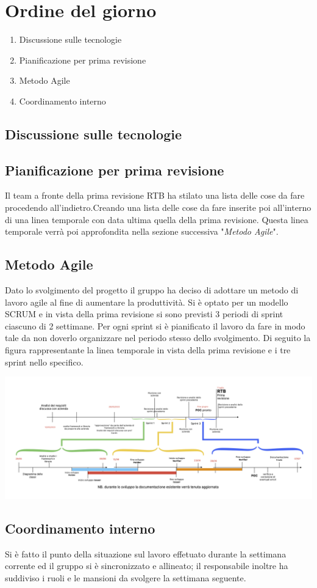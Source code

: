 \section{Ordine del giorno}
\begin{enumerate}
\item Discussione sulle tecnologie 
\item Pianificazione per prima revisione
\item Metodo Agile
\item Coordinamento interno 
\end{enumerate}

\subsection{Discussione sulle tecnologie}



\subsection{Pianificazione per prima revisione}
Il team a fronte della prima revisione RTB ha stilato una lista delle cose da fare procedendo all'indietro.Creando una lista delle cose da fare inserite poi all'interno di una linea temporale con data ultima quella della prima revisione.
Questa linea temporale verrà poi approfondita nella sezione successiva "\textit{Metodo Agile}".


\subsection{Metodo Agile}
Dato lo svolgimento del progetto il gruppo ha deciso di adottare un metodo di lavoro agile al fine di aumentare la produttività.
Si è optato per un modello SCRUM e in vista della prima revisione si sono previsti 3 periodi di sprint ciascuno di 2 settimane. 
Per ogni sprint si è pianificato il lavoro da fare in modo tale da non doverlo organizzare nel periodo stesso dello svolgimento.
Di seguito la figura rappresentante la linea temporale in vista della prima revisione e i tre sprint nello specifico. 
\begin{center}
	\includegraphics[scale = 0.35]{./res/images/RTB-1a-revisione.png}
\end{center}

\subsection{Coordinamento interno}
Si è fatto il punto della situazione sul lavoro effetuato durante la settimana corrente ed il gruppo si è sincronizzato e allineato; il responsabile inoltre ha suddiviso i ruoli e le mansioni da svolgere la settimana seguente. 
